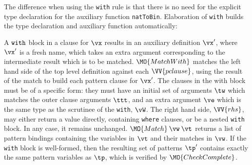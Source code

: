 The difference when using the \texttt{with} rule is that there is no need for
the explicit type declaration for the auxiliary function \texttt{natToBin}.
Elaboration of \texttt{with} builds the type declaration and auxiliary function
automatically:



A $\mathtt{with}$ block in a clause for $\vx$
results in an auxiliary definition $\vx'$, where $\vx'$ is a fresh name,
which takes an extra argument corresponding to the intermediate result which
is to be matched.
$\MO{MatchWith}$ matches the left hand side of the top level definition against
each $\VV{pclause}$, using the result of the match to build each pattern clause
for $\vx'$. 
The clauses in the with block must be of a specific form: they must have an initial
set of arguments $\tw$ which matches the outer clause arguments
$\ttt$, and an extra argument
$\ve$ which is the same type as the scrutinee of the \texttt{with}, $\vW$.
The right hand side, $\VV{rhs}$, may either return a value directly, containing 
\texttt{where} clauses, or be a nested \texttt{with} block. In any case, it
remains unchanged.
$\MO{Match}\:\vw\:\vt$ returns a list of pattern bindings containing
the variables in $\vt$ and their matches in $\vw$.
If the \texttt{with} block is well-formed, then
the resulting set of patterns $\tp'$ contains exactly the same pattern variables
as $\tp$, which is verified by $\MO{CheckComplete}$.


